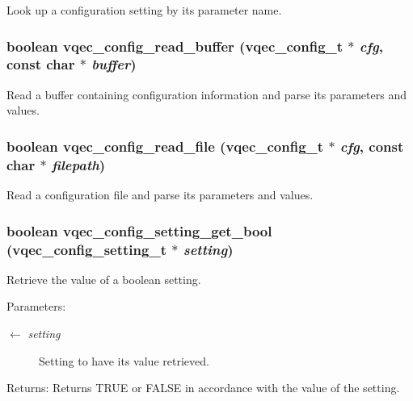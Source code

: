 Look up a configuration setting by its parameter name. 
\subsubsection{\setlength{\rightskip}{0pt plus 5cm}boolean vqec\_\-config\_\-read\_\-buffer (\bf{vqec\_\-config\_\-t} $\ast$ {\em cfg}, const char $\ast$ {\em buffer})}\label{vqec__config__parser_8h_82c73039ce3c5830f6f87ff3acb63d06}


Read a buffer containing configuration information and parse its parameters and values. 
\subsubsection{\setlength{\rightskip}{0pt plus 5cm}boolean vqec\_\-config\_\-read\_\-file (\bf{vqec\_\-config\_\-t} $\ast$ {\em cfg}, const char $\ast$ {\em filepath})}\label{vqec__config__parser_8h_5250d19c8cd6d637ccb1646604b8b43b}


Read a configuration file and parse its parameters and values. 
\subsubsection{\setlength{\rightskip}{0pt plus 5cm}boolean vqec\_\-config\_\-setting\_\-get\_\-bool (\bf{vqec\_\-config\_\-setting\_\-t} $\ast$ {\em setting})}\label{vqec__config__parser_8h_2124526ced2aa28db34fb626c93773aa}


Retrieve the value of a boolean setting.

\begin{Desc}
\item[Parameters:]
\begin{description}
\item[\mbox{$\leftarrow$} {\em setting}]Setting to have its value retrieved. \end{description}
\end{Desc}
\begin{Desc}
\item[Returns:]Returns TRUE or FALSE in accordance with the value of the setting. \end{Desc}
